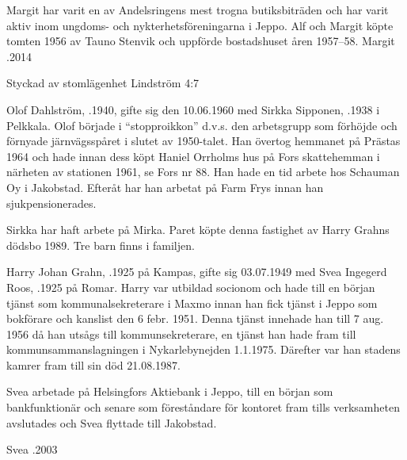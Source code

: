 Margit har varit en av Andelsringens mest trogna butiksbiträden och har varit aktiv inom ungdoms- och nykterhetsföreningarna i Jeppo. Alf och Margit köpte tomten 1956 av Tauno Stenvik och uppförde bostadshuset åren 1957--58.
Margit .2014



%

Styckad av stomlägenhet Lindström 4:7


%
Olof Dahlström, .1940, gifte sig den 10.06.1960 med Sirkka Sipponen, .1938 i Pelkkala. Olof började i ``stopproikkon'' d.v.s. den arbetsgrupp som förhöjde och förnyade järnvägsspåret i slutet av 1950-talet. Han övertog hemmanet på Prästas 1964 och hade innan dess köpt Haniel Orrholms hus på Fors skattehemman i närheten av stationen 1961, se Fors nr 88. Han hade en tid arbete hos Schauman Oy i Jakobstad. Efteråt har han arbetat på Farm Frys innan han sjukpensionerades.

Sirkka har haft arbete på Mirka. Paret köpte denna fastighet av Harry Grahns dödsbo 1989. Tre barn finns i familjen.
\begin{jhchildren}
  \item {}
  \item {}
  \item {}
\end{jhchildren}


%
Harry Johan Grahn, .1925 på Kampas, gifte sig 03.07.1949 med Svea Ingegerd Roos, .1925 på Romar. Harry var utbildad socionom och hade till en början tjänst som kommunalsekreterare i Maxmo innan han fick tjänst i Jeppo som bokförare och kanslist den 6 febr. 1951. Denna tjänst innehade han till 7 aug. 1956 då han utsågs till kommunsekreterare, en tjänst han hade fram till kommunsammanslagningen i Nykarlebynejden 1.1.1975. Därefter var han stadens kamrer fram till sin död 21.08.1987.

Svea arbetade på Helsingfors Aktiebank i Jeppo, till en början som bankfunktionär och senare som föreståndare för kontoret fram tills verksamheten avslutades och Svea flyttade till Jakobstad.
\begin{jhchildren}
  \item {}
  \item {}
  \item {}
\end{jhchildren}
Svea .2003



